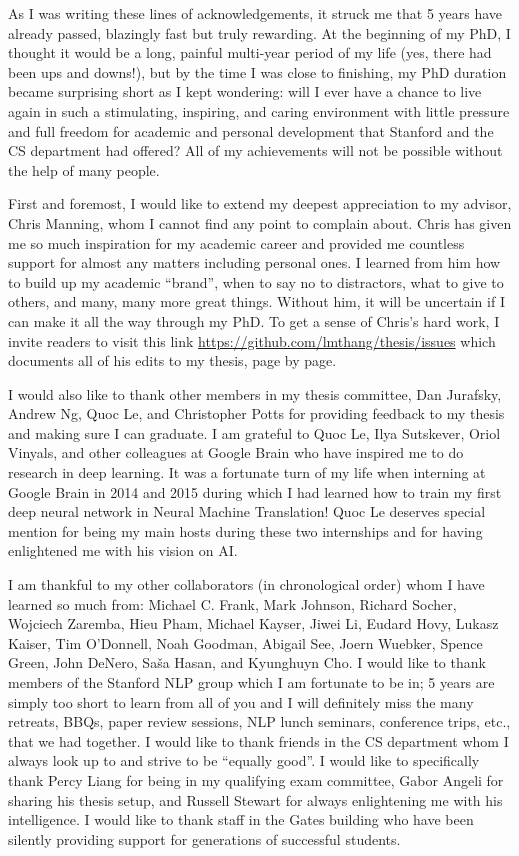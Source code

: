 As I was writing these lines of acknowledgements, it struck me that 5 years have
already passed, blazingly fast but truly rewarding. At the beginning of my PhD,
I thought it would be a long, painful multi-year period of my life (yes, there
had been ups and downs!), but by the time I was close to finishing, my PhD
duration became surprising short as I kept wondering: will I ever have a chance
to live again in such a stimulating, inspiring, and caring environment with
little pressure and full freedom for academic and personal development that
Stanford and the CS department had offered? All of my achievements will not be
possible without the help of many people.

First and foremost, I would like to extend my deepest appreciation to my
advisor, Chris Manning, whom I cannot find any point to complain about. Chris
has given me so much inspiration for my academic career and provided me
countless support for almost any matters including personal ones. I learned from
him how to build up my academic ``brand'', when to say no to distractors,
what to give to others, and many, many more great things.
Without him, it will be uncertain
if I can make it all the way through my PhD. To get a sense of Chris's hard work,
I invite readers to visit this link
\url{https://github.com/lmthang/thesis/issues} which documents all of his edits
to my thesis, page by page.

I would also like to thank other members in my thesis committee, Dan Jurafsky,
Andrew Ng, Quoc Le, and Christopher Potts for providing feedback to my thesis
and making sure I can graduate. I am grateful to Quoc Le, Ilya Sutskever,
Oriol Vinyals, and other colleagues at Google Brain who have inspired me to do
research in deep learning. It was a fortunate turn of my life when interning at
Google Brain in 2014 and 2015 during which I had learned how to train my first
deep neural network in Neural Machine Translation! Quoc Le deserves special
mention for being my main hosts during these two internships and for having
enlightened me with his vision on AI.


I am thankful to my other collaborators (in chronological order) whom I have
learned so much from: Michael C. Frank, Mark Johnson, Richard Socher, Wojciech
Zaremba, Hieu Pham, Michael Kayser, Jiwei Li, Eudard Hovy, Lukasz Kaiser, Tim
O'Donnell, Noah Goodman, Abigail See, Joern Wuebker, Spence Green, John
DeNero, Sa\v{s}a Hasan, and Kyunghuyn Cho. I would like to thank members of the
Stanford NLP group which I am fortunate to be in; 5 years are simply too short
to learn from all of you and I will definitely miss the many retreats, BBQs,
paper review sessions, NLP lunch seminars, conference trips, etc., that we had
together. I would like to thank friends in the CS department whom I always look
up to and strive to be ``equally good''. I would like to specifically thank Percy
Liang for being in my qualifying exam committee, Gabor Angeli for sharing his
thesis setup, and Russell Stewart for always
enlightening me with his intelligence. I would like to thank staff in the Gates
building who have been silently providing support for generations of successful
students.

